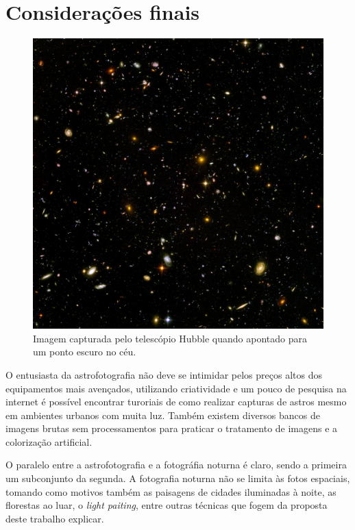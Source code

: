 \documentclass[
	article,			%
	12pt,				%
	oneside,			%
	a4paper,			%
	english,			%
	brazil,				%
	sumario=tradicional
	]{abntex2}
\begin{document}
\section{Considerações finais}
\label{conclusion}
\begin{figure}[th]
	\includegraphics[width=\linewidth,]{img/Hubble_ultra_deep_field}
	\caption{Imagem capturada pelo telescópio Hubble quando apontado para um ponto escuro no céu.}
	\label{fig:hubbledeepspace}
	\centering
\end{figure}

O entusiasta da astrofotografia não deve se intimidar pelos preços altos dos
equipamentos mais avençados, utilizando criatividade e um pouco de pesquisa na
internet é possível encontrar turoriais de como realizar capturas de astros
mesmo em ambientes urbanos com muita luz. Também existem diversos bancos de
imagens brutas sem processamentos para praticar o tratamento de imagens e a
colorização artificial.

O paralelo entre a astrofotografia e a fotográfia noturna é claro, sendo a
primeira um subconjunto da segunda. A fotografia noturna não se limita às fotos
espaciais, tomando como motivos também as paisagens de cidades iluminadas à
noite, as florestas ao luar, o \textit{light paiting}, entre outras técnicas que
fogem da proposta deste trabalho explicar.
\end{document}
